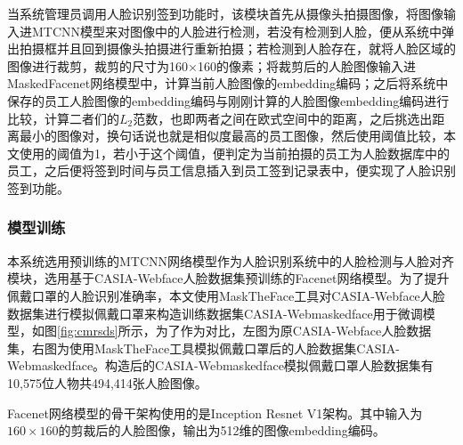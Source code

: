 当系统管理员调用人脸识别签到功能时，该模块首先从摄像头拍摄图像，将图像输入进MTCNN模型来对图像中的人脸进行检测，若没有检测到人脸，便从系统中弹出拍摄框并且回到摄像头拍摄进行重新拍摄；若检测到人脸存在，就将人脸区域的图像进行裁剪，裁剪的尺寸为160$\times$160的像素；将裁剪后的人脸图像输入进MaskedFacenet网络模型中，计算当前人脸图像的embedding编码；之后将系统中保存的员工人脸图像的embedding编码与刚刚计算的人脸图像embedding编码进行比较，计算二者们的$L_2$范数，也即两者之间在欧式空间中的距离，之后挑选出距离最小的图像对，换句话说也就是相似度最高的员工图像，然后使用阈值比较，本文使用的阈值为1，若小于这个阈值，便判定为当前拍摄的员工为人脸数据库中的员工，之后便将签到时间与员工信息插入到员工签到记录表中，便实现了人脸识别签到功能。

\subsubsection{模型训练}

本系统选用预训练的MTCNN网络模型作为人脸识别系统中的人脸检测与人脸对齐模块，选用基于CASIA-Webface人脸数据集预训练的Facenet网络模型。为了提升佩戴口罩的人脸识别准确率，本文使用MaskTheFace工具对CASIA-Webface人脸数据集进行模拟佩戴口罩来构造训练数据集CASIA-Webmaskedface用于微调模型，如图\ref{fig:cmrsds}所示，为了作为对比，左图为原CASIA-Webface人脸数据集，右图为使用MaskTheFace工具模拟佩戴口罩后的人脸数据集CASIA-Webmaskedface。构造后的CASIA-Webmaskedface模拟佩戴口罩人脸数据集有10,575位人物共494,414张人脸图像。

Facenet网络模型的骨干架构使用的是Inception Resnet V1架构。其中输入为$160\times 160$的剪裁后的人脸图像，输出为512维的图像embedding编码。

